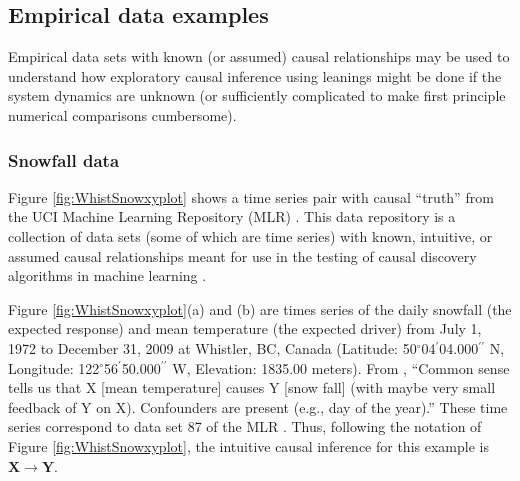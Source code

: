 \documentclass{article}[10pt]
\begin{document}
\subsection{Empirical data examples}
\label{sec:emp}
Empirical data sets with known (or assumed) causal relationships may be used to understand how exploratory causal inference using leanings might be done if the system dynamics are unknown (or sufficiently complicated to make first principle numerical comparisons cumbersome).

\subsubsection{Snowfall data}
Figure \ref{fig:WhistSnowxyplot} shows a time series pair with causal ``truth'' from the UCI Machine Learning Repository (MLR) \cite{bache2013}.  This data repository is a collection of data sets (some of which are time series) with known, intuitive, or assumed causal relationships meant for use in the testing of causal discovery algorithms in machine learning \cite{bache2013}.

Figure \ref{fig:WhistSnowxyplot}(a) and (b)  are times series of the daily snowfall (the expected response) and mean temperature (the expected driver) from July 1, 1972 to December 31, 2009 at Whistler, BC, Canada (Latitude: 50$^\circ$04$^\prime$04.000$^{\prime\prime}$ N, Longitude: 122$^\circ$56$^\prime$50.000$^{\prime\prime}$ W, Elevation: 1835.00 meters).  From \cite{bache2013}, ``Common sense tells us that X [mean temperature] causes Y [snow fall] (with maybe very small feedback of Y on X). Confounders are present (e.g., day of the year).''  These time series correspond to data set 87 of the MLR \cite{bache2013}.  Thus, following the notation of Figure \ref{fig:WhistSnowxyplot}, the intuitive causal inference for this example is $\mathbf{X}\rightarrow\mathbf{Y}$. 
\end{document}

